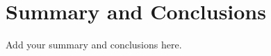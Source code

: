 \documentclass{article}
\begin{document}


\newpage
\section{Summary and Conclusions}
Add your summary and conclusions here.

\printbibliography
\end{document}

